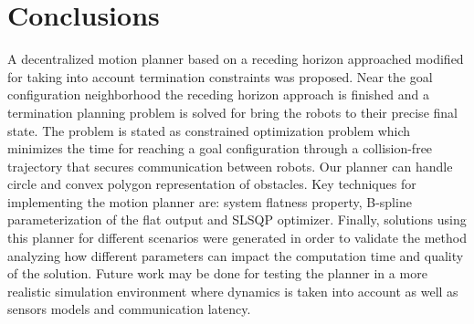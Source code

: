 \documentclass[eprint]{actapoly}
\begin{document}
%

\section{Conclusions}

A decentralized motion planner based on a receding horizon approached modified for taking into account 
termination constraints was proposed. Near the goal configuration 
neighborhood the receding horizon approach is finished and a termination planning 
problem is solved for bring the robots to their precise final state.
The problem is stated as constrained optimization problem which minimizes the time 
for reaching a goal configuration through a collision-free trajectory that 
secures communication between robots. Our planner can handle circle and convex polygon representation of obstacles.
Key techniques for implementing the motion planner are: system flatness property, 
B-spline parameterization of the flat output and SLSQP optimizer.
Finally, solutions using this planner for different scenarios were generated in 
order to validate the method analyzing how different parameters can impact the 
computation time and quality of the solution.
Future work may be done for testing the planner in a more realistic simulation environment where dynamics is taken into account as well as sensors models and communication latency.




%




\end{document}
